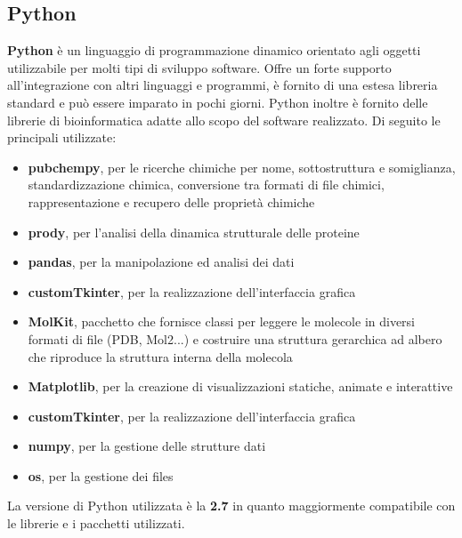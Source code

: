 \subsection{Python}
\def\baselinestretch{1.66}
\noindent \textbf{Python} è un linguaggio di programmazione dinamico orientato agli oggetti utilizzabile per molti tipi  di sviluppo software. Offre un forte supporto all'integrazione con altri linguaggi e programmi, è fornito di una estesa libreria standard e può essere imparato in pochi giorni. Python inoltre è fornito delle librerie di bioinformatica adatte allo scopo del software realizzato. Di seguito le principali utilizzate:
\begin{itemize}
    \item \textbf{pubchempy}, per le ricerche chimiche per nome, sottostruttura e somiglianza, standardizzazione chimica, conversione tra formati di file chimici, rappresentazione e recupero delle proprietà chimiche
    \item \textbf{prody}, per l'analisi della dinamica strutturale delle proteine
    \item \textbf{pandas}, per la manipolazione ed analisi dei dati
    \item \textbf{customTkinter}, per la realizzazione dell'interfaccia grafica
    \item \textbf{MolKit}, pacchetto che fornisce classi per leggere le molecole in diversi formati di file (PDB, Mol2...) e costruire una struttura gerarchica ad albero che riproduce la struttura interna della molecola
    \item \textbf{Matplotlib}, per la creazione di visualizzazioni statiche, animate e interattive
    \item \textbf{customTkinter}, per la realizzazione dell'interfaccia grafica
    \item \textbf{numpy}, per la gestione delle strutture dati
    \item \textbf{os}, per la gestione dei files
\end{itemize} 
La versione di Python utilizzata è la \textbf{2.7} in quanto maggiormente compatibile con le librerie e i pacchetti utilizzati.

